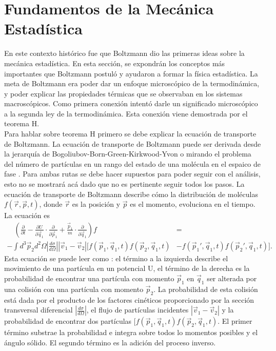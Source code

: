 \section{Fundamentos de la Mecánica Estadística}

En este contexto histórico fue que Boltzmann dio las primeras ideas sobre la mecánica estadística. En esta sección, se expondrán los conceptos más importantes que Boltzmann postuló y ayudaron a formar la física estadística. La meta de Boltzmann era poder dar un enfoque microscópico de la termodinámica, y poder explicar las propiedades térmicas que se observaban en los sistemas macroscópicos. Como primera conexión intentó darle un significado microscópico a la segunda ley de la termodinámica. Esta conexión viene demostrada por el teorema H.
\\
Para hablar sobre teorema H primero se debe explicar la ecuación de transporte de Boltzmann. La ecuación de transporte de Boltzmann puede ser derivada desde la jerarquía de Bogoliubov-Born-Green-Kirkwood-Yvon o mirando el problema del número de partículas en un rango del estado de una molécula en el espaico de fase \cite{HuangStat}. Para ambas rutas se debe hacer supuestos para poder seguir con el análisis, esto no se mostrará acá dado que no es pertinente seguir todos los pasos. La ecuación de transporte de Boltzmann describe cómo la distribución de moléculas $f(\vec{r},\vec{p},t)$, donde $\vec{r}$ es la posición y $\vec{p}$ es el momento,  evoluciona en el tiempo. La ecuación es 	
\begin{align*}
\quad (\frac{\partial}{\partial t}- \frac{\partial U}{\partial \vec{q}_{1}} \cdot \frac{\partial}{\partial \vec{p}_{1}} +\frac{\vec{p}_{1}}{m} \cdot \frac{\partial}{\partial \vec{q}_{1}})f  &=
\\
- \int d^{3}\vec{p}_{2}d^{2} \Omega |\frac{d \sigma}{d \Omega}| |\vec{v}_{1}-\vec{v}_{2}|[f(\vec{p}_{1},\vec{q}_{1},t)f(\vec{p}_{2},\vec{q}_{1},t) &- f(\vec{p}_{1}',\vec{q}_{1},t)f(\vec{p}_{2}',\vec{q}_{1},t)].
\end{align*}
Esta ecuación se puede leer como \cite{KardarStat}: el término a la izquierda describe el movimiento de una partícula en un potencial U, el término de la derecha es la probabilidad de encontrar una partícula con momento $\vec{p}_{1}$ en $\vec{q}_{1}$ ser alterada por una colisión con una partícula con momento $\vec{p}_{2}$.  La probabilidad de esta colisión está dada por el producto de los factores cinéticos proporcionado por la sección transversal diferencial $ |\frac{d \sigma}{d \Omega}|$, el flujo de partículas incidentes $|\vec{v}_{1}-\vec{v}_{2}|$ y la probabilidad de encontrar dos partículas $[f(\vec{p}_{1},\vec{q}_{1},t)f(\vec{p}_{2},\vec{q}_{1},t)$. El primer término substrae la probabilidad e integra sobre todos lo momentos posibles y el ángulo sólido. El segundo término es la adición del proceso inverso. 
